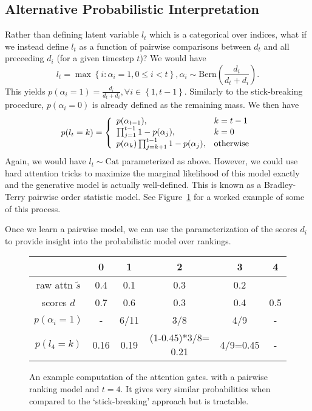 \documentclass{article}
\newcommand\set[1]{\left\{#1\right\}}
\newcommand{\Cat}{\mathrm{Cat}}
\newcommand\Bern{\mathrm{Bern}}
\begin{document}
\subsection{Alternative Probabilistic Interpretation}
Rather than defining latent variable $l_t$ which is a categorical over indices,
what if we instead define $l_t$ as a function of pairwise comparisons between $d_t$
and all preceeding $d_i$ (for a given timestep $t$)?
We would have
$$l_t = \max \set{i : \alpha_i = 1, 0\leq i<t},
\alpha_i \sim \Bern\left(\frac{d_i}{d_t+d_i}\right).$$
This yields
$p(\alpha_i=1)=\frac{d_i}{d_t+d_i}, \forall i\in\set{1,t-1}$.
Similarly to the stick-breaking procedure, $p(\alpha_i=0)$ is already defined as the remaining mass.
We then have
\begin{equation*}
p(l_t=k) =\left\{\begin{array}{l l}
p(\alpha_{t-1}), & k=t-1\\
\prod_{j=1}^{t-1}1-p(\alpha_j), & k=0\\
p(\alpha_k)\prod_{j=k+1}^{t-1}1-p(\alpha_j), & \textrm{otherwise}
\end{array}\right.
\end{equation*}
Again, we would have $l_t\sim\Cat$ parameterized as above.
However, we could use hard attention tricks to maximize the marginal likelihood of this model exactly
and the generative model is actually well-defined.
This is known as a Bradley-Terry pairwise order statistic model.
See Figure~\ref{fig:geom} for a worked example of some of this process.

Once we learn a pairwise model, we can use the parameterization of the scores $d_i$
to provide insight into the probabilistic model over rankings.

\begin{figure}
\centering
\begin{tabular}{|c|c|c|c|c|c|}
\hline
& 0 & 1 & 2 & 3 & 4\\
\hline
raw attn $\tilde{s}$ & 0.4 & 0.1 & 0.3 & 0.2 & \\
\hline
scores $d$         & 0.7 & 0.6 & 0.3 & 0.4 & 0.5\\
\hline
$p(\alpha_i=1)$    & - & 6/11 & 3/8 & 4/9 & -\\
\hline
$p(l_4=k)$ & 0.16 & 0.19 & (1-0.45)*3/8= 0.21 & 4/9=0.45 & -\\
\hline
\end{tabular}
\caption{An example computation of the attention gates.
with a pairwise ranking model and $t=4$.
It gives very similar probabilities when compared to the `stick-breaking' approach but is tractable.}
\label{fig:geom}
\end{figure}
\end{document}
